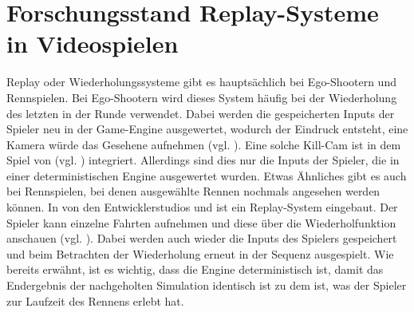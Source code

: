 \section{Forschungsstand Replay-Systeme in Videospielen}
Replay oder Wiederholungssysteme gibt es hauptsächlich bei Ego-Shootern und Rennspielen. Bei Ego-Shootern wird dieses System häufig bei der Wiederholung des letzten  in der Runde verwendet. Dabei werden die gespeicherten Inputs der Spieler neu in der Game-Engine ausgewertet, wodurch der Eindruck entsteht, eine Kamera würde das Gesehene aufnehmen (vgl. \cite{noauthor_new_nodate}). Eine solche Kill-Cam ist in dem Spiel  von  (vgl. \cite{noauthor_call_nodate}) integriert. Allerdings sind dies nur die Inputs der Spieler, die in einer deterministischen Engine ausgewertet wurden. Etwas Ähnliches gibt es auch bei Rennspielen, bei denen ausgewählte Rennen nochmals angesehen werden können. In  von den Entwicklerstudios  und  ist ein Replay-System eingebaut. Der Spieler kann einzelne Fahrten aufnehmen und diese über die Wiederholfunktion anschauen (vgl. \cite{noauthor_forza_nodate}). Dabei werden auch wieder die Inputs des Spielers gespeichert und beim Betrachten der Wiederholung erneut in der Sequenz ausgespielt. Wie bereits erwähnt, ist es wichtig, dass die Engine deterministisch ist, damit das Endergebnis der nachgeholten Simulation identisch ist zu dem ist, was der Spieler zur Laufzeit des Rennens erlebt hat. 


